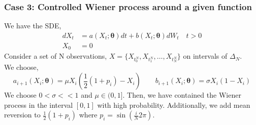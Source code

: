 \documentclass[aspectratio=169]{beamer}\usepackage[utf8]{inputenc}
\begin{document}
\begin{frame}\frametitle{Case 3: Controlled Wiener process around a given function }
We have the SDE,
\begin{equation}
\begin{split}
dX_t &= a(X_t; \bm{\theta}) dt + b (X_t; \bm{\theta} ) dW_t \quad t > 0 \\
X_0 & = 0
\end{split}\label{main}
\end{equation}
Consider a set of N observations, $X= \{ X_{t_0^N} , X_{t_1^N} ,\ldots , X_{t_N^N} \}$ on intervals of $\Delta_N$.\\ We choose,
\begin{equation}
a_{i+1}(X_i; \bm{\theta})= \mu X_i(\frac{1}{2}(1 + p_i )- X_i)  \quad \quad b_{i+1} (X_i; \bm{\theta} )=\sigma X_i (1-X_i)
\end{equation}
We choose $ 0<\sigma <<1$ and $\mu\in (0,1]$. Then, we have contained the Wiener process in the interval $[0,1]$ with high probability. Additionally, we add mean reversion to $\frac{1}{2}(1 + p_i ) $ where  $p_i = \sin(\frac{i}{N} 2\pi)$.


\end{frame}
\end{document}
